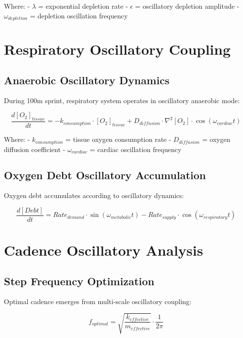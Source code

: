 \documentclass[12pt]{article}
\begin{document}
Where:
- $\lambda$ = exponential depletion rate
- $\epsilon$ = oscillatory depletion amplitude
- $\omega_{depletion}$ = depletion oscillation frequency

\section{Respiratory Oscillatory Coupling}

\subsection{Anaerobic Oscillatory Dynamics}

During 100m sprint, respiratory system operates in oscillatory anaerobic mode:

\begin{equation}
\frac{d[O_2]_{tissue}}{dt} = -k_{consumption} \cdot [O_2]_{tissue} + D_{diffusion} \cdot \nabla^2[O_2] \cdot \cos(\omega_{cardiac}t)
\end{equation}

Where:
- $k_{consumption}$ = tissue oxygen consumption rate
- $D_{diffusion}$ = oxygen diffusion coefficient
- $\omega_{cardiac}$ = cardiac oscillation frequency

\subsection{Oxygen Debt Oscillatory Accumulation}

Oxygen debt accumulates according to oscillatory dynamics:

\begin{equation}
\frac{d[Debt]}{dt} = Rate_{demand} \cdot \sin(\omega_{metabolic}t) - Rate_{supply} \cdot \cos(\omega_{respiratory}t)
\end{equation}

\section{Cadence Oscillatory Analysis}

\subsection{Step Frequency Optimization}

Optimal cadence emerges from multi-scale oscillatory coupling:

\begin{equation}
f_{optimal} = \sqrt{\frac{k_{effective}}{m_{effective}}} \cdot \frac{1}{2\pi}
\end{equation}
\end{document}
